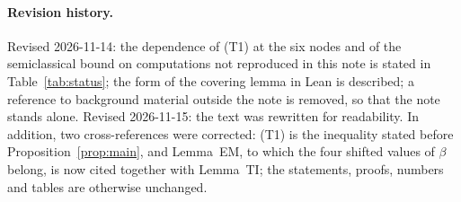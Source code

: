 \documentclass[11pt,a4paper]{article}
\theoremstyle{definition}
\theoremstyle{remark}
\begin{document}
\paragraph{Revision history.} Revised 2026-11-14: the dependence of (T1) at the six nodes and of the semiclassical bound on computations not reproduced in this note is stated in Table~\ref{tab:status}; the form of the covering lemma in Lean is described; a reference to background material outside the note is removed, so that the note stands alone. Revised 2026-11-15: the text was rewritten for readability. In addition, two cross-references were corrected: (T1) is the inequality stated before Proposition~\ref{prop:main}, and Lemma~EM, to which the four shifted values of $\beta$ belong, is now cited together with Lemma~TI; the statements, proofs, numbers and tables are otherwise unchanged.
\end{document}
